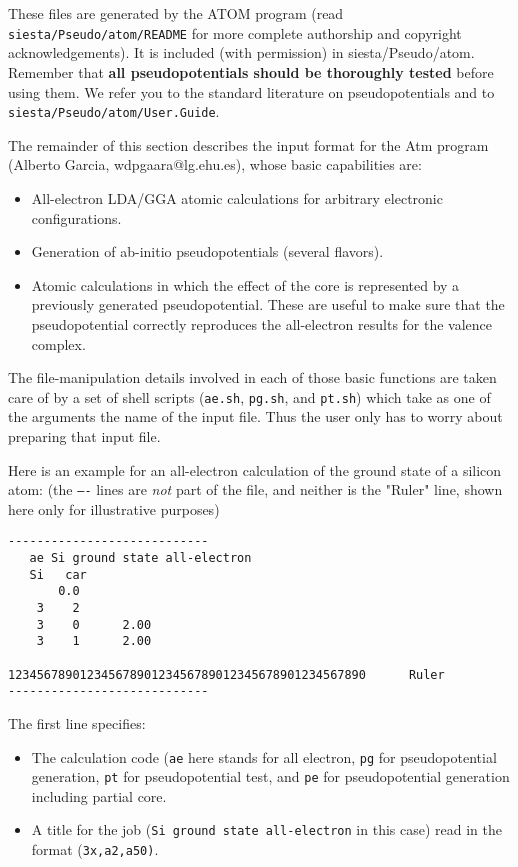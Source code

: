 \documentclass[11pt]{article}
\begin{document}
These files are generated by the ATOM program (read {\tt
siesta/Pseudo/atom/README} for more complete authorship and copyright
acknowledgements).  It is included (with permission) in
siesta/Pseudo/atom. Remember that {\bf all pseudopotentials should be
thoroughly tested} before using them. We refer you to the standard
literature on pseudopotentials and to {\tt siesta/Pseudo/atom/User.Guide}.

The remainder of this section describes the input format for the {\sc Atm}
program (Alberto Garcia, wdpgaara@lg.ehu.es), whose basic capabilities are:
\begin{itemize}
\item
All-electron LDA/GGA atomic calculations for arbitrary electronic 
configurations.

\item
Generation of ab-initio pseudopotentials (several flavors).

\item
Atomic calculations in which the effect of the core is represented
by a previously generated pseudopotential. These are useful to make
sure that the pseudopotential correctly reproduces the all-electron
results for the valence complex.
\end{itemize}

The file-manipulation details involved in each of those basic
functions are taken care of by a set of shell scripts ({\tt ae.sh}, 
{\tt pg.sh}, and {\tt pt.sh}) which take as one of the arguments the name 
of the input file. Thus the user only has to worry about preparing that input 
file.

Here is an example for an all-electron calculation of the ground state
of a silicon atom: (the {\tt ----} lines are {\it not} part of the file, and
neither is the "Ruler" line, shown here only for illustrative purposes)

\begin{verbatim}
----------------------------
   ae Si ground state all-electron
   Si   car  
       0.0
    3    2
    3    0      2.00
    3    1      2.00

12345678901234567890123456789012345678901234567890      Ruler
----------------------------
\end{verbatim}

The first line specifies:
\begin{itemize}
\item
The calculation code ({\tt ae} here stands for all electron,
{\tt pg} for pseudopotential generation, {\tt pt} for
pseudopotential test, and {\tt pe} for pseudopotential generation 
including partial core.

\item
A title for the job ({\tt Si ground state all-electron} in this case)
read in the format {(\tt 3x,a2,a50)}.
\end{itemize}
\end{document}
